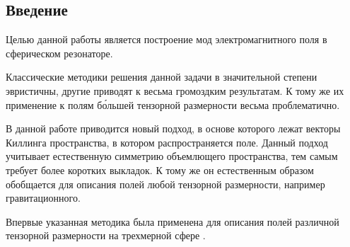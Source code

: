 %
%
%
%
%
%

\subsection*{Введение}

    Целью данной работы является построение мод электромагнитного поля в сферическом резонаторе.

    Классические методики решения данной задачи в значительной степени эвристичны, другие приводят к весьма громоздким результатам. К тому же их применение к полям б\'{о}льшей тензорной размерности весьма проблематично. \cite{burlankov_tmf}

    В данной работе приводится новый подход, в основе которого лежат векторы Киллинга пространства, в котором распространяется поле. Данный подход учитывает естественную симметрию объемлющего пространства, тем самым требует более коротких выкладок. К тому же он естественным образом обобщается для описания полей любой тензорной размерности, например гравитационного. \cite{burlankov_tmf}

    Впервые указанная методика была применена для описания полей различной тензорной размерности на трехмерной сфере \cite{burlankov_tmf}.
